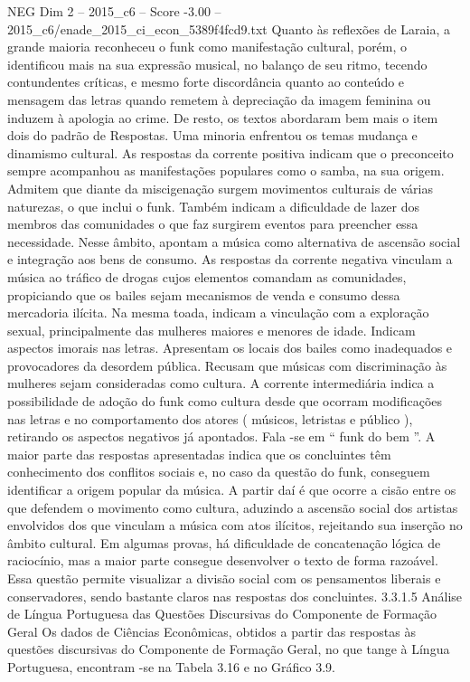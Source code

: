 \begin{textsample}{NEG Dim 2 – 2015\_c6 – Score -3.00 – 2015\_c6/enade\_2015\_ci\_econ\_5389f4fcd9.txt}
Quanto às reflexões de Laraia, a grande maioria reconheceu o funk como manifestação cultural, porém, o identificou mais na sua expressão musical, no balanço de seu ritmo, tecendo contundentes críticas, e mesmo forte discordância quanto ao conteúdo e mensagem das letras quando remetem à depreciação da imagem feminina ou induzem à apologia ao crime.
De resto, os textos abordaram bem mais o item dois do padrão de Respostas.
Uma minoria enfrentou os temas mudança e dinamismo cultural.
As respostas da corrente positiva indicam que o preconceito sempre acompanhou as manifestações populares como o samba, na sua origem.
Admitem que diante da miscigenação surgem movimentos culturais de várias naturezas, o que inclui o funk.
Também indicam a dificuldade de lazer dos membros das comunidades o que faz surgirem eventos para preencher essa necessidade.
Nesse âmbito, apontam a música como alternativa de ascensão social e integração aos bens de consumo.
As respostas da corrente negativa vinculam a música ao tráfico de drogas cujos elementos comandam as comunidades, propiciando que os bailes sejam mecanismos de venda e consumo dessa mercadoria ilícita.
Na mesma toada, indicam a vinculação com a exploração sexual, principalmente das mulheres maiores e menores de idade.
Indicam aspectos imorais nas letras.
Apresentam os locais dos bailes como inadequados e provocadores da desordem pública.
Recusam que músicas com discriminação às mulheres sejam consideradas como cultura.
A corrente intermediária indica a possibilidade de adoção do funk como cultura desde que ocorram modificações nas letras e no comportamento dos atores ( músicos, letristas e público ), retirando os aspectos negativos já apontados.
Fala -se em “ funk do bem ”.
A maior parte das respostas apresentadas indica que os concluintes têm conhecimento dos conflitos sociais e, no caso da questão do funk, conseguem identificar a origem popular da música.
A partir daí é que ocorre a cisão entre os que defendem o movimento como cultura, aduzindo a ascensão social dos artistas envolvidos dos que vinculam a música com atos ilícitos, rejeitando sua inserção no âmbito cultural.
Em algumas provas, há dificuldade de concatenação lógica de raciocínio, mas a maior parte consegue desenvolver o texto de forma razoável.
Essa questão permite visualizar a divisão social com os pensamentos liberais e conservadores, sendo bastante claros nas respostas dos concluintes. 3.3.1.5 Análise de Língua Portuguesa das Questões Discursivas do Componente de Formação Geral Os dados de Ciências Econômicas, obtidos a partir das respostas às questões discursivas do Componente de Formação Geral, no que tange à Língua Portuguesa, encontram -se na Tabela 3.16 e no Gráfico 3.9.

\end{textsample}
